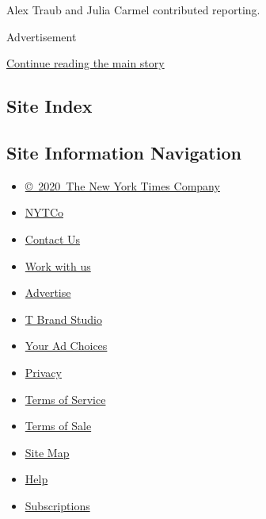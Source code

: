 Alex Traub and Julia Carmel contributed reporting.

Advertisement

\protect\hyperlink{after-bottom}{Continue reading the main story}

\hypertarget{site-index}{%
\subsection{Site Index}\label{site-index}}

\hypertarget{site-information-navigation}{%
\subsection{Site Information
Navigation}\label{site-information-navigation}}

\begin{itemize}
\tightlist
\item
  \href{https://help.nytimes3xbfgragh.onion/hc/en-us/articles/115014792127-Copyright-notice}{©~2020~The
  New York Times Company}
\end{itemize}

\begin{itemize}
\tightlist
\item
  \href{https://www.nytco.com/}{NYTCo}
\item
  \href{https://help.nytimes3xbfgragh.onion/hc/en-us/articles/115015385887-Contact-Us}{Contact
  Us}
\item
  \href{https://www.nytco.com/careers/}{Work with us}
\item
  \href{https://nytmediakit.com/}{Advertise}
\item
  \href{http://www.tbrandstudio.com/}{T Brand Studio}
\item
  \href{https://www.nytimes3xbfgragh.onion/privacy/cookie-policy\#how-do-i-manage-trackers}{Your
  Ad Choices}
\item
  \href{https://www.nytimes3xbfgragh.onion/privacy}{Privacy}
\item
  \href{https://help.nytimes3xbfgragh.onion/hc/en-us/articles/115014893428-Terms-of-service}{Terms
  of Service}
\item
  \href{https://help.nytimes3xbfgragh.onion/hc/en-us/articles/115014893968-Terms-of-sale}{Terms
  of Sale}
\item
  \href{https://spiderbites.nytimes3xbfgragh.onion}{Site Map}
\item
  \href{https://help.nytimes3xbfgragh.onion/hc/en-us}{Help}
\item
  \href{https://www.nytimes3xbfgragh.onion/subscription?campaignId=37WXW}{Subscriptions}
\end{itemize}
